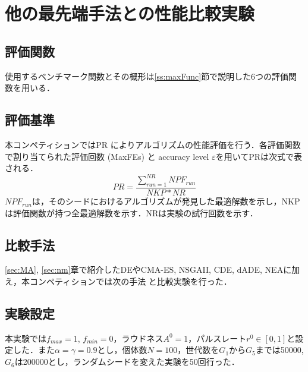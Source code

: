 \documentclass[a4j,11pt]{jarticle}
\begin{document}
\FloatBarrier
\newpage
\section{他の最先端手法との性能比較実験}
\label{sec:experiment}



\subsection{評価関数}
\label{sss:benchmark}
使用するベンチマーク関数とその概形は\ref{ss:maxFunc}節で説明した6つの評価関数を用いる．


\subsection{評価基準}
\label{ss:eval_criteria}
本コンペティションではPR \cite{CEC2013} によりアルゴリズムの性能評価を行う．各評価関数で割り当てられた評価回数 (MaxFEs) と accuracy level $\varepsilon$を用いてPRは次式で表される．
\begin{equation}
\label{eq:PR}
PR=\frac{\sum_{run=1}^{NR}NPF_{run}}{NKP*NR}
\end{equation}
$NPF_{run}$は，そのシードにおけるアルゴリズムが発見した最適解数を示し，NKPは評価関数が持つ全最適解数を示す．NRは実験の試行回数を示す．

\subsection{比較手法}
\ref{sec:MA}, \ref{sec:nm}章で紹介したDEやCMA-ES, NSGAII, CDE, dADE, NEAに加え，本コンペティションでは次の手法 \cite{PNA-NSGA} \cite{DEs} \cite{N-VMO} と比較実験を行った．

\subsection{実験設定}
本実験では$f_{max}=1$, $f_{min}=0$，ラウドネス$A^0=1$，パルスレート$r^0 \in [0,1]$と設定した．また$\alpha= \gamma = 0.9$とし，個体数$N=100$，世代数を$G_1$から$G_5$までは50000, $G_6$は200000とし，ランダムシードを変えた実験を50回行った．
\end{document}
